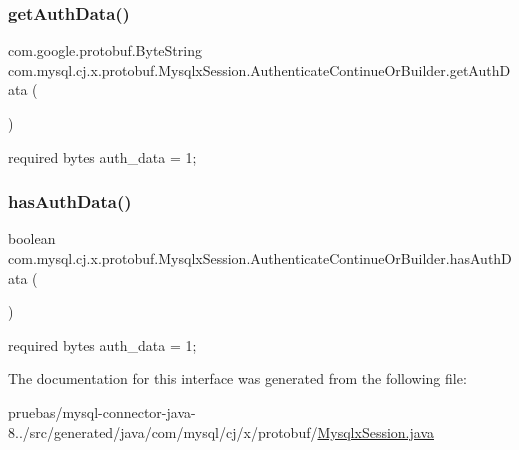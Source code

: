 \subsubsection{\texorpdfstring{get\+Auth\+Data()}{getAuthData()}}
{\footnotesize\ttfamily com.\+google.\+protobuf.\+Byte\+String com.\+mysql.\+cj.\+x.\+protobuf.\+Mysqlx\+Session.\+Authenticate\+Continue\+Or\+Builder.\+get\+Auth\+Data (\begin{DoxyParamCaption}{ }\end{DoxyParamCaption})}

{\ttfamily required bytes auth\+\_\+data = 1;} \mbox{\label{interfacecom_1_1mysql_1_1cj_1_1x_1_1protobuf_1_1_mysqlx_session_1_1_authenticate_continue_or_builder_a971d3adc955797742de2724eb0391d18}} 
\subsubsection{\texorpdfstring{has\+Auth\+Data()}{hasAuthData()}}
{\footnotesize\ttfamily boolean com.\+mysql.\+cj.\+x.\+protobuf.\+Mysqlx\+Session.\+Authenticate\+Continue\+Or\+Builder.\+has\+Auth\+Data (\begin{DoxyParamCaption}{ }\end{DoxyParamCaption})}

{\ttfamily required bytes auth\+\_\+data = 1;} 

The documentation for this interface was generated from the following file\+:\begin{DoxyCompactItemize}
\item 
pruebas/mysql-\/connector-\/java-\/8../src/generated/java/com/mysql/cj/x/protobuf/\mbox{\hyperlink{generated_2java_2com_2mysql_2cj_2x_2protobuf_2_mysqlx_session_8java}{Mysqlx\+Session.\+java}}\end{DoxyCompactItemize}
